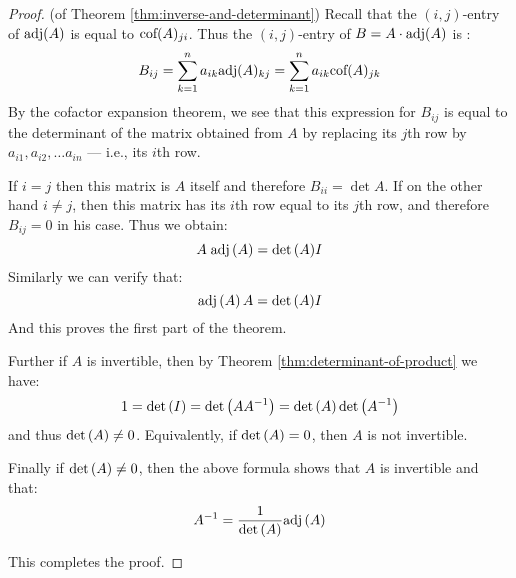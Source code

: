 \begin{proof} (of Theorem \ref{thm:inverse-and-determinant})
Recall that the $(i,j)$-entry of $\mbox{\rm adj}(A)$ is equal to $\mbox{\rm cof}(A)_{ji}$.  Thus the $(i,j)$-entry of   $B=A\cdot \mbox{\rm adj}(A)$ is : 
\[
B_{ij}=\sum_{k=1}^n a_{ik} \mbox{\rm adj} (A)_{kj}= \sum_{k=1}^n a_{ik} \mbox{\rm cof} (A)_{jk}
\]
By the cofactor expansion theorem, we see that this expression for $B_{ij}$ is equal to the determinant of the
matrix obtained from $A$ by replacing its $j$th  row  by $a_{i1}, a_{i2}, \dots a_{in}$ --- i.e., its $i$th row. 

If $i=j$ then this matrix is $A$ itself and therefore $B_{ii}=\det
A$. If on the other hand $i\neq j$, then this matrix has its $i$th row
equal to its $j$th row, and therefore $B_{ij}=0$ in his case. Thus we obtain: 
\begin{equation*}
A \; \mbox{\rm adj}\left(A\right) = {\det \left(A\right)} I
\end{equation*}
Similarly we can verify that:
\begin{equation*}
\mbox{\rm adj}\left(A\right)A = {\det \left(A\right)} I
\end{equation*}
And this proves the first part of the theorem. 

Further if $A$ is  invertible, then by Theorem \ref{thm:determinant-of-product} we have:
\[ 1 = \det \left(I \right) = \det \left(A A^{-1} \right) = \det \left(A \right) \det \left(A^{-1} \right) \]
and thus $\det \left(A \right) \neq 0$. Equivalently, if  $\det \left(A \right) = 0$, then $A$ is not invertible. 

Finally if $\det \left(A \right) \neq 0$, then the above formula shows that $A$ is invertible and that:
\begin{equation*}
A^{-1} = \frac{1}{\det \left(A\right)} \mbox{\rm adj}\left(A\right)
\end{equation*}

This completes the proof.
\end{proof}


